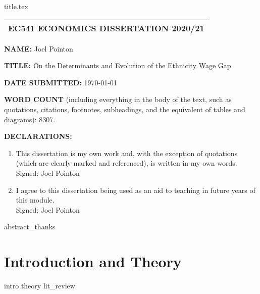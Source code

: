 \documentclass[openany,a4paper,12pt]{book}
\begin{document}
\pagestyle{headings}
\pagestyle{fancy}
\fancyfoot[R]{\thepage}

\frontmatter
{title.tex}
\clearpage
\setcounter{page}{1}
\thispagestyle{plain}
\doublespacing
\begin{center}
         \begin{tabular}{| c |} 
         \hline
         \textbf{EC541 ECONOMICS DISSERTATION 2020/21} \\
         \hline
        \end{tabular}
\end{center}
\vspace{15pt}
\indent \indent \textbf{NAME:} Joel Pointon
\vspace{30pt}

\textbf{TITLE:} On the Determinants and Evolution of the Ethnicity Wage Gap
\vspace{30pt}

\textbf{DATE SUBMITTED:} \today
\vspace{30pt}

\textbf{WORD COUNT} (including everything in the body of the text, such as quotations, citations, footnotes, subheadings, and the equivalent of tables and diagrams): 8307. %
\vspace{30pt}

\textbf{DECLARATIONS:}
\begin{enumerate}
    \item This dissertation is my own work and, with the exception of quotations (which are clearly marked and referenced), is written in my own words. \\Signed: Joel Pointon
    \item I agree to this dissertation being used as an aid to teaching in future years of this module. \\Signed: Joel Pointon
\end{enumerate}
\newpage
{abstract_thanks} %
\let\cleardoublepage\clearpage
\thispagestyle{plain}
\tableofcontents
\newpage
\thispagestyle{plain}
\listoftables
\newpage
\listoffigures
\mainmatter %
\newpage
\chapter{Introduction and Theory} %
{intro} %
{theory} %
{lit_review} %
\end{document}

